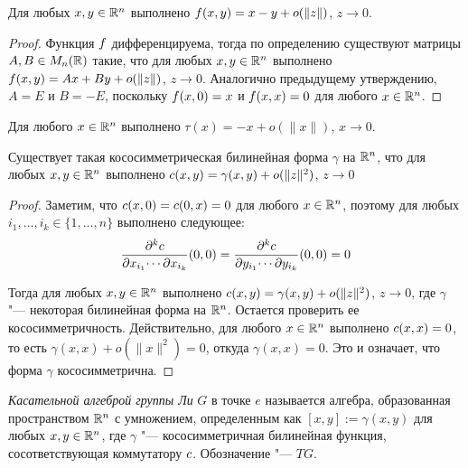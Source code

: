 \begin{proposition}
	Для любых $x, y \in \mathbb{R}^n$ выполнено $f(x, y) = x - y + o(\|z\|)$, $z \to 0$.
\end{proposition}

\begin{proof}
	Функция $f$ дифференцируема, тогда по определению существуют матрицы $A, B \in M_n(\mathbb{R})$ такие, что для любых $x, y \in \mathbb{R}^n$ выполнено $f(x, y) = Ax + By + o(\|z\|)$, $z \to 0$. Аналогично предыдущему утверждению, $A = E$ и $B = -E$, поскольку $f(x, 0) = x$ и $f(x, x) = 0$ для любого $x \in \mathbb{R}^n$.
\end{proof}

\begin{corollary}
	Для любого $x \in \mathbb{R}^n$ выполнено $\tau(x) = -x + o(\|x\|)$, $x \to 0$.
\end{corollary}

\begin{theorem}
	Существует такая кососимметрическая билинейная форма $\gamma$ на $\mathbb{R}^n$, что для любых $x, y \in \mathbb{R}^n$ выполнено $c(x, y) = \gamma(x, y) + o(\|z\|^2)$, $z \to 0$
\end{theorem}

\begin{proof}
	Заметим, что $c(x, 0) = c(0, x) = 0$ для любого $x \in \mathbb{R}^n$, поэтому для любых $i_1, \dotsc, i_k \in \{1, \dotsc, n\}$ выполнено следующее:
	\[\frac{\partial^k c}{\partial x_{i_1} \!\dotsb \partial x_{i_k}}(0, 0) = \frac{\partial^k c}{\partial y_{i_1} \!\dotsb \partial y_{i_k}}(0, 0) = 0\]
	
	Тогда для любых $x, y \in \mathbb{R}^n$ выполнено $c(x, y) = \gamma(x, y) + o(\|z\|^2)$, $z \to 0$, где $\gamma$ "--- некоторая билинейная форма на $\mathbb{R}^n$. Остается проверить ее кососимметричность. Действительно, для любого $x \in \mathbb{R}^n$ выполнено $c(x, x) = 0$, то есть $\gamma(x, x) + o(\|x\|^2) = 0$, откуда $\gamma(x, x) = 0$. Это и означает, что форма $\gamma$ кососимметрична.
\end{proof}

\begin{definition}
	\textit{Касательной алгеброй группы Ли} $G$ в точке $e$ называется алгебра, образованная пространством $\mathbb{R}^n$ с умножением, определенным как $[x, y] := \gamma(x, y)$ для любых $x, y \in \mathbb{R}^n$, где $\gamma$ "--- кососимметричная билинейная функция, сосответствующая коммутатору $c$. Обозначение "--- $T{G}$.
\end{definition}

\pagebreak

